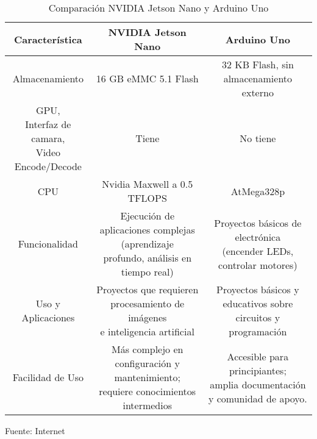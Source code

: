 \begin{table}[H]
  \centering
  \begin{tabular}{|c|c|c|}
      \hline
      Característica & NVIDIA Jetson Nano & Arduino Uno\\
      \hline
      Almacenamiento & 16 GB eMMC 5.1 Flash & \parbox[c]{4cm}{32 KB Flash, sin\\almacenamiento\\externo}\\ 
      \hline
      \parbox[c]{4.5cm}{GPU,\\Interfaz de camara,\\Video Encode/Decode} & Tiene & No tiene\\
      \hline
      CPU & Nvidia Maxwell a 0.5 TFLOPS & AtMega328p\\
      \hline
      Funcionalidad & \parbox[c]{6cm}{Ejecución de aplicaciones complejas (aprendizaje\\profundo, análisis en tiempo real)} & \parbox[c]{4cm}{Proyectos básicos de electrónica\\(encender LEDs, controlar motores)}\\
      \hline
      Uso y Aplicaciones & \parbox[c]{6cm}{Proyectos que requieren procesamiento de imágenes\\e inteligencia artificial} & \parbox[c]{4cm}{Proyectos básicos y educativos sobre\\circuitos y\\programación}\\
      \hline
      Facilidad de Uso & \parbox[c]{6cm}{Más complejo en configuración y mantenimiento;\\requiere conocimientos intermedios} & \parbox[c]{4cm}{Accesible para principiantes;\\amplia documentación y comunidad de apoyo.}\\
      \hline
  \end{tabular}
  \caption{Comparación NVIDIA Jetson Nano y Arduino Uno}{Fuente: Internet}
\end{table}